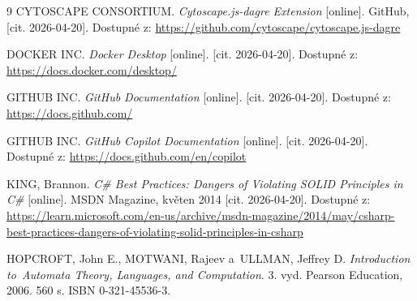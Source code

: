 \documentclass[
  master,
  program=ainfvs,
  printversion,
  figures=false,
  tables=false,
  glossaries,
  index
]{kidiplom}
\begin{document}
\begin{thebibliography}{9}
 \uppercase{Cytoscape Consortium}. \textit{Cytoscape.js-dagre Extension} [online]. GitHub, [cit. 2026-04-20]. Dostupné z: \url{https://github.com/cytoscape/cytoscape.js-dagre}

 \uppercase{Docker Inc.} \textit{Docker Desktop} [online]. [cit. 2026-04-20]. Dostupné z: \url{https://docs.docker.com/desktop/}

 \uppercase{GitHub Inc.} \textit{GitHub Documentation} [online]. [cit. 2026-04-20]. Dostupné z: \url{https://docs.github.com/}

 \uppercase{GitHub Inc.} \textit{GitHub Copilot Documentation} [online]. [cit. 2026-04-20]. Dostupné z: \url{https://docs.github.com/en/copilot}

 \uppercase{King}, Brannon. \textit{C\# Best Practices: Dangers of Violating SOLID Principles in C\#} [online]. MSDN Magazine, květen 2014 [cit. 2026-04-20]. Dostupné z: \url{https://learn.microsoft.com/en-us/archive/msdn-magazine/2014/may/csharp-best-practices-dangers-of-violating-solid-principles-in-csharp}

 \uppercase{Hopcroft}, John E., \uppercase{Motwani}, Rajeev a~\uppercase{Ullman}, Jeffrey D. \textit{Introduction to~Automata Theory, Languages, and Computation}. 3. vyd. Pearson Education, 2006. 560 s. ISBN 0-321-45536-3.

\end{thebibliography}

\printindex
\end{document}
